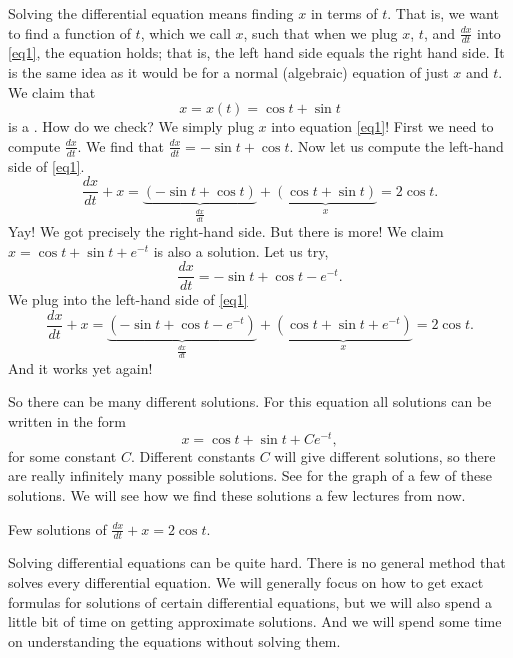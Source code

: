 Solving the differential equation means finding $x$ in terms of $t$.  That
is, we want to find a function of $t$, which we call $x$, such that when
we plug $x$, $t$, and $\frac{dx}{dt}$ into \eqref{eq1}, the equation holds;
that is, the left hand side equals the right hand side.
It is
the same idea as it would be for a normal (algebraic) equation of just
$x$ and $t$.  We claim that
\begin{equation*}
x = x(t) = \cos t + \sin t
\end{equation*}
is a \emph{}.
How do we check?  We simply plug $x$ into equation \eqref{eq1}!  First we
need to compute $\frac{dx}{dt}$.  We find that $\frac{dx}{dt} = 
-\sin t + \cos t$.  Now let us compute the left-hand side
of \eqref{eq1}.
\begin{equation*}
\frac{dx}{dt} + x = 
\underbrace{(-\sin t + \cos t)}_{\frac{dx}{dt}}
+
\underbrace{(\cos t + \sin t)}_{x}
=
2\cos t .
\end{equation*}
Yay!  We got precisely the right-hand side.
But there is more!
We claim
$x = \cos t + \sin t + e^{-t}$ is also
a solution.  Let us try,
\begin{equation*}
\frac{dx}{dt} = -\sin t + \cos t - e^{-t} .
\end{equation*}
We plug into the left-hand side of \eqref{eq1}
\begin{equation*}
\frac{dx}{dt} + x = 
\underbrace{(-\sin t + \cos t - e^{-t})}_{\frac{dx}{dt}} +
\underbrace{(\cos t + \sin t + e^{-t})}_{x}
= 2\cos t .
\end{equation*}
And it works yet again!

So there can be many different solutions.  For this equation all
solutions can be written in the form
\begin{equation*}
x = \cos t + \sin t + C e^{-t} ,
\end{equation*}
for some constant $C$.  Different constants $C$ will give different
solutions, so there are really infinitely many possible solutions.
See  for the graph of a
few of these solutions. 
We will see how we find these solutions
a few lectures from now.

\medskip

\begin{mywrapfig}{3.25in}
\capstart
{}
\caption{Few solutions of $\frac{dx}{dt} + x = 2 \cos t$.\label{intro:plotsfig}}
\end{mywrapfig}%


Solving differential equations can be quite hard.  
There is no general method that solves every differential equation.  We will
generally focus on how to get exact formulas for solutions of certain
differential
equations, but we will also spend a little bit of time
on getting approximate solutions.
And we will spend some time on understanding the equations without solving
them.

